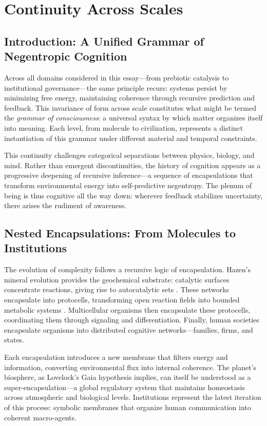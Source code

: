 \documentclass[11pt,a4paper]{article}
\begin{document}
\section{Continuity Across Scales}
\label{sec:continuity}

\subsection{Introduction: A Unified Grammar of Negentropic Cognition}

Across all domains considered in this essay—from prebiotic catalysis to institutional governance—the same principle recurs: systems persist by minimizing free energy, maintaining coherence through recursive prediction and feedback.  This invariance of form across scale constitutes what might be termed the \emph{grammar of consciousness}: a universal syntax by which matter organizes itself into meaning.  Each level, from molecule to civilization, represents a distinct instantiation of this grammar under different material and temporal constraints.

This continuity challenges categorical separations between physics, biology, and mind.  Rather than emergent discontinuities, the history of cognition appears as a progressive deepening of recursive inference—a sequence of encapsulations that transform environmental energy into self-predictive negentropy.  The plenum of being is thus cognitive all the way down: wherever feedback stabilizes uncertainty, there arises the rudiment of awareness.

\subsection{Nested Encapsulations: From Molecules to Institutions}

The evolution of complexity follows a recursive logic of encapsulation.  Hazen’s mineral evolution \citep{Hazen2008MineralEvolution} provides the geochemical substrate: catalytic surfaces concentrate reactions, giving rise to autocatalytic sets \citep{Kauffman1993OriginsOfOrder}.  These networks encapsulate into protocells, transforming open reaction fields into bounded metabolic systems \citep{MaturanaVarela1980Autopoiesis}.  Multicellular organisms then encapsulate these protocells, coordinating them through signaling and differentiation.  Finally, human societies encapsulate organisms into distributed cognitive networks—families, firms, and states.

Each encapsulation introduces a new membrane that filters energy and information, converting environmental flux into internal coherence.  The planet’s biosphere, as Lovelock’s Gaia hypothesis implies, can itself be understood as a super-encapsulation—a global regulatory system that maintains homeostasis across atmospheric and biological levels.  Institutions represent the latest iteration of this process: symbolic membranes that organize human communication into coherent macro-agents.
\end{document}
